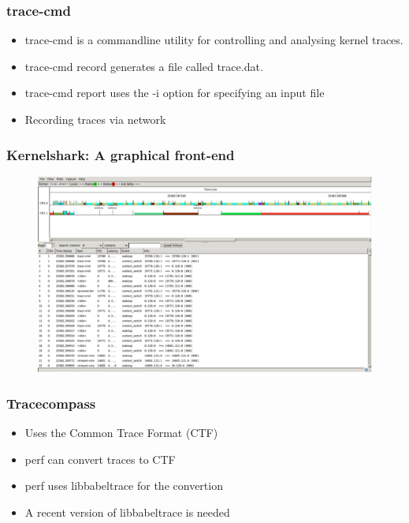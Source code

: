 % 
\begin{frame}[fragile]
    \frametitle{trace-cmd}


    \begin{itemize}
        \item trace-cmd is a commandline utility for controlling and analysing kernel traces.
        \item trace-cmd record generates a file called trace.dat.
        \item trace-cmd report uses the -i option for specifying an input file
        \item Recording traces via network
    \end{itemize}
% 
\end{frame}
\begin{frame}[fragile]
    \frametitle{Kernelshark: A graphical front-end}

% 
  \begin{figure}
    \centering
    \includegraphics[width=0.75\linewidth]{figs/trace-kernelshark.png}
	\end{figure}


% 
\end{frame}
\begin{frame}[fragile]
    \frametitle{Tracecompass}


    \begin{itemize}
        \item Uses the Common Trace Format (CTF)
        \item perf can convert traces to CTF
        \item perf uses libbabeltrace for the convertion
        \item A recent version of libbabeltrace is needed
    \end{itemize}
% 
\end{frame}
